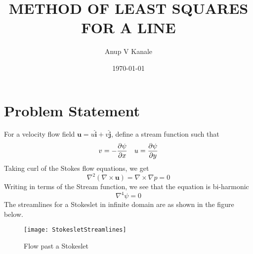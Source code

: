 \documentclass[11pt, oneside]{article}   	%
\title{\vspace{-6ex}\Large METHOD OF LEAST SQUARES FOR A LINE}
\author{\vspace{-6ex}Anup V Kanale}
\date{\vspace{-3ex}\today}							%
\begin{document}
\maketitle
\section*{Problem Statement}
For a velocity flow field $\boldsymbol{u} = u\boldsymbol{\hat{i}} + v \boldsymbol{\hat{j}} $, define a stream function such that
\begin{equation}
v = -\pdv{\psi}{x} \quad  u = \pdv{\psi}{y}
 \end{equation}
Taking curl of the Stokes flow equations, we get
\begin{equation}
 \nabla^2 (\nabla \times \boldsymbol{u}) = \nabla \times \nabla p = 0
\end{equation}
Writing in terms of the Stream function, we see that the equation is bi-harmonic
\begin{equation}
\nabla^4 \psi=0
\end{equation}
The streamlines for a Stokeslet in infinite domain are as shown in the figure below.
\begin{figure} [!htbp]
\centering
\texttt{[image: StokesletStreamlines]}
\caption{Flow past a Stokeslet}
\end{figure}
\end{document}
